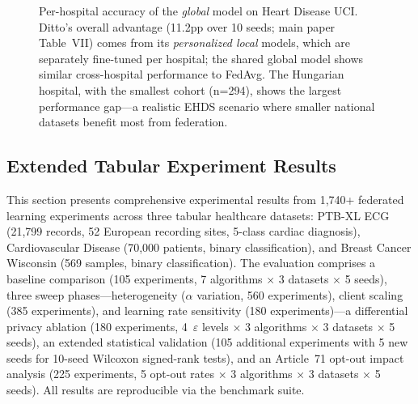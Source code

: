 \documentclass[conference]{IEEEtran}
\begin{document}
\begin{figure}[htbp]
\centering
{}
\caption{Per-hospital accuracy of the \textit{global} model on Heart Disease UCI. Ditto's overall advantage (11.2pp over 10 seeds; main paper Table~VII) comes from its \textit{personalized local} models, which are separately fine-tuned per hospital; the shared global model shows similar cross-hospital performance to FedAvg. The Hungarian hospital, with the smallest cohort (n=294), shows the largest performance gap---a realistic EHDS scenario where smaller national datasets benefit most from federation.}
\label{fig:per_hospital}
\end{figure}


\subsection{Extended Tabular Experiment Results}
\label{sec:extended_tabular}

This section presents comprehensive experimental results from 1,740+ federated learning experiments across three tabular healthcare datasets: PTB-XL ECG (21,799 records, 52 European recording sites, 5-class cardiac diagnosis), Cardiovascular Disease (70,000 patients, binary classification), and Breast Cancer Wisconsin (569 samples, binary classification). The evaluation comprises a baseline comparison (105 experiments, 7 algorithms $\times$ 3 datasets $\times$ 5 seeds), three sweep phases---heterogeneity ($\alpha$ variation, 560 experiments), client scaling (385 experiments), and learning rate sensitivity (180 experiments)---a differential privacy ablation (180 experiments, 4~$\varepsilon$ levels $\times$ 3 algorithms $\times$ 3 datasets $\times$ 5 seeds), an extended statistical validation (105 additional experiments with 5 new seeds for 10-seed Wilcoxon signed-rank tests), and an Article~71 opt-out impact analysis (225 experiments, 5 opt-out rates $\times$ 3 algorithms $\times$ 3 datasets $\times$ 5 seeds). All results are reproducible via the benchmark suite.
\end{document}
